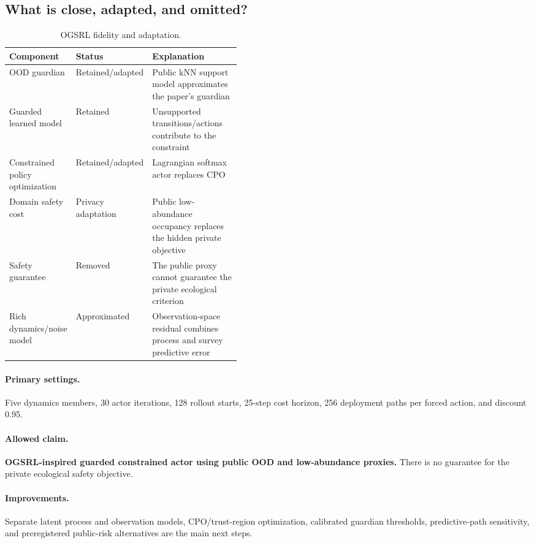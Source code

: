 \documentclass[11pt,a4paper]{article}
\newcommand{\adaptation}[1]{\textcolor{adaptgreen}{\textbf{#1}}}
\begin{document}
\subsection{What is close, adapted, and omitted?}

\begin{table}[ht]
\centering
\caption{OGSRL fidelity and adaptation.}
\begin{tabularx}{\linewidth}{P{0.25\linewidth}P{0.19\linewidth}Y}
\toprule
Component & Status & Explanation \\
\midrule
OOD guardian & Retained/adapted & Public kNN support model approximates the paper's guardian \\
Guarded learned model & Retained & Unsupported transitions/actions contribute to the constraint \\
Constrained policy optimization & Retained/adapted & Lagrangian softmax actor replaces CPO \\
Domain safety cost & Privacy adaptation & Public low-abundance occupancy replaces the hidden private objective \\
Safety guarantee & Removed & The public proxy cannot guarantee the private ecological criterion \\
Rich dynamics/noise model & Approximated & Observation-space residual combines process and survey predictive error \\
\bottomrule
\end{tabularx}
\end{table}

\paragraph{Primary settings.}
Five dynamics members, 30 actor iterations, 128 rollout starts, 25-step cost horizon, 256 deployment
paths per forced action, and discount 0.95.

\paragraph{Allowed claim.}
\adaptation{OGSRL-inspired guarded constrained actor using public OOD and low-abundance proxies.}
There is no guarantee for the private ecological safety objective.

\paragraph{Improvements.}
Separate latent process and observation models, CPO/trust-region optimization, calibrated guardian
thresholds, predictive-path sensitivity, and preregistered public-risk alternatives are the main
next steps.
\end{document}
